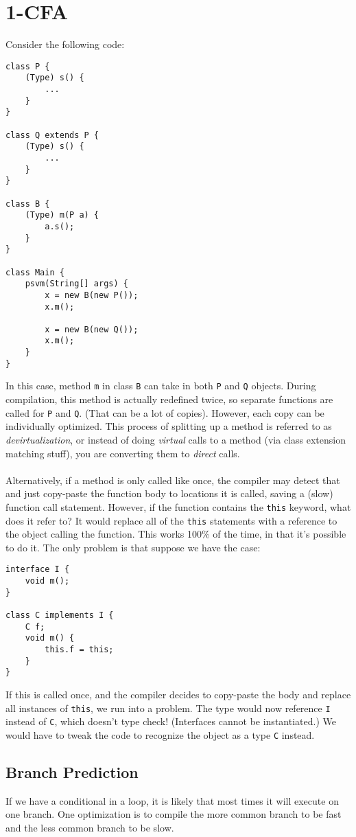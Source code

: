 \documentclass[10pt]{article}
\begin{document}
\section*{1-CFA}
Consider the following code:
\begin{verbatim}
class P {
    (Type) s() {
        ...
    }
}

class Q extends P {
    (Type) s() {
        ...
    }
}

class B {
    (Type) m(P a) {
        a.s();
    }
}

class Main {
    psvm(String[] args) {
        x = new B(new P());
        x.m();

        x = new B(new Q());
        x.m();  
    }
}    
\end{verbatim}
In this case, method \texttt{m} in class \texttt{B} can take in both \texttt{P} and \texttt{Q} objects.  During compilation, this method is actually redefined twice, so separate functions are called for \texttt{P} and \texttt{Q}.  (That can be a lot of copies).  However, each copy can be individually optimized.  This process of splitting up a method is referred to as \textit{devirtualization}, or instead of doing \textit{virtual} calls to a method (via class extension matching stuff), you are converting them to \textit{direct} calls.\\\\
Alternatively, if a method is only called like once, the compiler may detect that and just copy-paste the function body to locations it is called, saving a (slow) function call statement.  However, if the function contains the \texttt{this} keyword, what does it refer to?  It would replace all of the \texttt{this} statements with a reference to the object calling the function.  This works 100\% of the time, in that it's possible to do it.  The only problem is that suppose we have the case:
\begin{verbatim}
interface I {
    void m();
}

class C implements I {
    C f;
    void m() {
        this.f = this;
    }
}
\end{verbatim}
If this is called once, and the compiler decides to copy-paste the body and replace all instances of \texttt{this}, we run into a problem.  The type would now reference \texttt{I} instead of \texttt{C}, which doesn't type check!  (Interfaces cannot be instantiated.)  We would have to tweak the code to recognize the object as a type \texttt{C} instead.\\

\subsection*{Branch Prediction}
If we have a conditional in a loop, it is likely that most times it will execute on one branch.  One optimization is to compile the more common branch to be fast and the less common branch to be slow.
\end{document}
